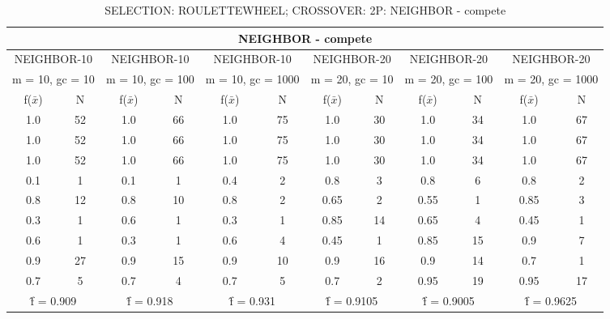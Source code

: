 \begin{table}[H]
	\centering
	\caption{SELECTION: ROULETTEWHEEL; CROSSOVER: 2P: NEIGHBOR - compete}
	\begin{adjustbox}{width=1\textwidth}
		\begin{tabular}{ |c|c||c|c||c|c||c|c||c|c||c|c| }
			\hline
			\multicolumn{12}{|c|}{NEIGHBOR - compete} \\
			\hline
			\multicolumn{2}{|c||}{NEIGHBOR-10} & \multicolumn{2}{c||}{NEIGHBOR-10} & \multicolumn{2}{c||}{NEIGHBOR-10} & \multicolumn{2}{c||}{NEIGHBOR-20} & \multicolumn{2}{c||}{NEIGHBOR-20} & \multicolumn{2}{c|}{NEIGHBOR-20}\\
			\hline
			\multicolumn{2}{|c||}{m = 10, gc = 10} & \multicolumn{2}{c||}{m = 10, gc = 100} & \multicolumn{2}{c||}{m = 10, gc = 1000} & \multicolumn{2}{c||}{m = 20, gc = 10} & \multicolumn{2}{c||}{m = 20, gc = 100} & \multicolumn{2}{c|}{m = 20, gc = 1000}\\
			\hline
			f($\bar{x}$) & N & f($\bar{x}$) & N & f($\bar{x}$) & N & f($\bar{x}$) & N & f($\bar{x}$) & N & f($\bar{x}$) & N\\
			\hline
			\hline
			1.0 & 52 & 1.0 & 66 & 1.0 & 75 & 1.0 & 30 & 1.0 & 34 & 1.0 & 67\\
			\hline
			1.0 & 52 & 1.0 & 66 & 1.0 & 75 & 1.0 & 30 & 1.0 & 34 & 1.0 & 67\\
			1.0 & 52 & 1.0 & 66 & 1.0 & 75 & 1.0 & 30 & 1.0 & 34 & 1.0 & 67\\
			0.1 & 1 & 0.1 & 1 & 0.4 & 2 & 0.8 & 3 & 0.8 & 6 & 0.8 & 2\\
			0.8 & 12 & 0.8 & 10 & 0.8 & 2 & 0.65 & 2 & 0.55 & 1 & 0.85 & 3\\
			0.3 & 1 & 0.6 & 1 & 0.3 & 1 & 0.85 & 14 & 0.65 & 4 & 0.45 & 1\\
			0.6 & 1 & 0.3 & 1 & 0.6 & 4 & 0.45 & 1 & 0.85 & 15 & 0.9 & 7\\
			0.9 & 27 & 0.9 & 15 & 0.9 & 10 & 0.9 & 16 & 0.9 & 14 & 0.7 & 1\\
			0.7 & 5 & 0.7 & 4 & 0.7 & 5 & 0.7 & 2 & 0.95 & 19 & 0.95 & 17\\
			\hline
			\multicolumn{2}{|c||}{\^{f} = 0.909} & \multicolumn{2}{c||}{\^{f} = 0.918} & \multicolumn{2}{c||}{\^{f} = 0.931} & \multicolumn{2}{c||}{\^{f} = 0.9105} & \multicolumn{2}{c||}{\^{f} = 0.9005} & \multicolumn{2}{c|}{\^{f} = 0.9625}\\
			\hline
		\end{tabular}
	\end{adjustbox}
\end{table}

